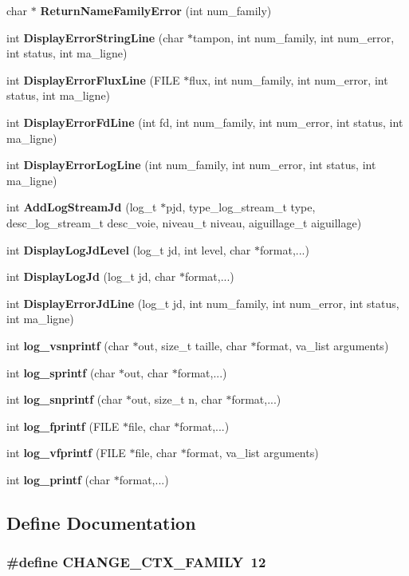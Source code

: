\begin{CompactItemize}
\item 
char $\ast$ {\bf ReturnNameFamilyError} (int num\_\-family)
\item 
int {\bf DisplayErrorStringLine} (char $\ast$tampon, int num\_\-family, int num\_\-error, int status, int ma\_\-ligne)
\item 
int {\bf DisplayErrorFluxLine} (FILE $\ast$flux, int num\_\-family, int num\_\-error, int status, int ma\_\-ligne)
\item 
int {\bf DisplayErrorFdLine} (int fd, int num\_\-family, int num\_\-error, int status, int ma\_\-ligne)
\item 
int {\bf DisplayErrorLogLine} (int num\_\-family, int num\_\-error, int status, int ma\_\-ligne)
\item 
int {\bf AddLogStreamJd} (log\_\-t $\ast$pjd, type\_\-log\_\-stream\_\-t type, desc\_\-log\_\-stream\_\-t desc\_\-voie, niveau\_\-t niveau, aiguillage\_\-t aiguillage)
\item 
int {\bf DisplayLogJdLevel} (log\_\-t jd, int level, char $\ast$format,...)
\item 
int {\bf DisplayLogJd} (log\_\-t jd, char $\ast$format,...)
\item 
int {\bf DisplayErrorJdLine} (log\_\-t jd, int num\_\-family, int num\_\-error, int status, int ma\_\-ligne)
\item 
int {\bf log\_\-vsnprintf} (char $\ast$out, size\_\-t taille, char $\ast$format, va\_\-list arguments)
\item 
int {\bf log\_\-sprintf} (char $\ast$out, char $\ast$format,...)
\item 
int {\bf log\_\-snprintf} (char $\ast$out, size\_\-t n, char $\ast$format,...)
\item 
int {\bf log\_\-fprintf} (FILE $\ast$file, char $\ast$format,...)
\item 
int {\bf log\_\-vfprintf} (FILE $\ast$file, char $\ast$format, va\_\-list arguments)
\item 
int {\bf log\_\-printf} (char $\ast$format,...)
\end{CompactItemize}


\subsection{Define Documentation}
\subsubsection[{CHANGE\_\-CTX\_\-FAMILY}]{\setlength{\rightskip}{0pt plus 5cm}\#define CHANGE\_\-CTX\_\-FAMILY~12}\label{log__functions_8c_c17d4d368d983fbf98f635e481375fc4}




